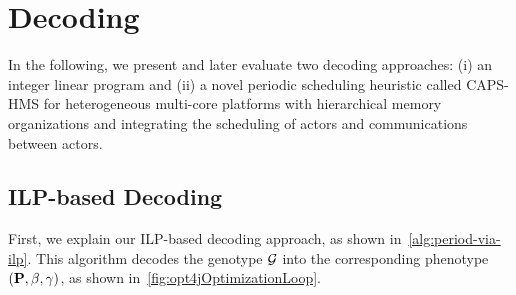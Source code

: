 \section{Decoding}\label{sec:decoding}

In the following, we present and later evaluate two decoding approaches: (i) an integer linear program and (ii) a novel periodic scheduling heuristic called \acs{CAPS-HMS} for heterogeneous multi-core platforms with hierarchical memory organizations and integrating the scheduling of actors and communications between actors.

\subsection{\acs{ILP}-based Decoding}\label{sec:ILP}

First, we explain our \ac{ILP}-based decoding approach, as shown in~\cref{alg:period-via-ilp}.
This algorithm decodes the genotype $\mathcal{G}$ into the corresponding phenotype $(\mathbf{P}, \beta, \gamma)$, as shown in~\cref{fig:opt4jOptimizationLoop}.

